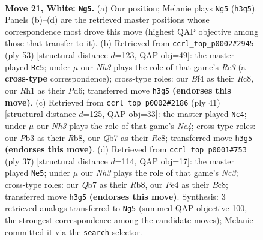 \documentclass[11pt]{article}
\begin{document}
\clearpage

\begin{figure}[p]\centering
\begin{subfigure}{0.46\textwidth}\centering
\resizebox{\linewidth}{!}{%
\newchessgame
\chessboard[
  setfen={r2q1br1/1Q1nkp2/3p1np1/2pP4/4PB2/1PN4N/P2K4/5R1R w - - 5 21},
  showmover=false,
  pgfstyle=straightmove, color=movearrow, markmove={h3-g5}
]}
\caption{}
\end{subfigure}\hfill
\begin{subfigure}{0.46\textwidth}\centering
\resizebox{\linewidth}{!}{%
\newchessgame
\chessboard[
  setfen={2r3k1/5p1p/2rp2p1/q3n3/1RbNP3/P7/2P1BQPP/5RK1 b - - 2 27},
  showmover=false,
  pgfstyle=straightmove, color=movearrow, markmove={c6-c5}
]}
\caption{}
\end{subfigure}
\\[4pt]
\begin{subfigure}{0.46\textwidth}\centering
\resizebox{\linewidth}{!}{%
\newchessgame
\chessboard[
  setfen={1rr3k1/4qppp/R4n2/3pn3/1b6/2N1P2P/1BQ1NPP1/3R2K1 b - - 4 21},
  showmover=false,
  pgfstyle=straightmove, color=movearrow, markmove={e5-c4}
]}
\caption{}
\end{subfigure}\hfill
\begin{subfigure}{0.46\textwidth}\centering
\resizebox{\linewidth}{!}{%
\newchessgame
\chessboard[
  setfen={1rbq1rk1/5pp1/p1np1n1p/8/P3P3/1B2RN1P/3N1PP1/2RQ2K1 b - - 1 19},
  showmover=false,
  pgfstyle=straightmove, color=movearrow, markmove={c6-e5}
]}
\caption{}
\end{subfigure}
\caption{\textbf{Move 21, White: \texttt{Ng5}.} (a) Our position; Melanie plays \texttt{Ng5} (\texttt{h3g5}). Panels (b)--(d) are the retrieved master positions whose correspondence most drove this move (highest QAP objective among those that transfer to it). (b) Retrieved from \texttt{ccrl\_top\_p0002\#2945} (ply 53) [structural distance $d$=123, QAP obj=49]: the master played \texttt{Rc5}; under $\mu$ our \emph{Nh3} plays the role of that game's \emph{Rc3} (a \textbf{cross-type} correspondence); cross-type roles: our \emph{B}f4 as their \emph{R}c8, our \emph{R}h1 as their \emph{P}d6; transferred move \texttt{h3g5} \textbf{(endorses this move)}. (c) Retrieved from \texttt{ccrl\_top\_p0002\#2186} (ply 41) [structural distance $d$=125, QAP obj=33]: the master played \texttt{Nc4}; under $\mu$ our \emph{Nh3} plays the role of that game's \emph{Ne4}; cross-type roles: our \emph{P}b3 as their \emph{R}b8, our \emph{Q}b7 as their \emph{R}c8; transferred move \texttt{h3g5} \textbf{(endorses this move)}. (d) Retrieved from \texttt{ccrl\_top\_p0001\#753} (ply 37) [structural distance $d$=114, QAP obj=17]: the master played \texttt{Ne5}; under $\mu$ our \emph{Nh3} plays the role of that game's \emph{Nc3}; cross-type roles: our \emph{Q}b7 as their \emph{R}b8, our \emph{P}e4 as their \emph{B}c8; transferred move \texttt{h3g5} \textbf{(endorses this move)}. Synthesis: 3 retrieved analogs transferred to \texttt{Ng5} (summed QAP objective 100, the strongest correspondence among the candidate moves); Melanie committed it via the \texttt{search} selector.}
\label{fig:thought-m40}
\end{figure}
\end{document}
